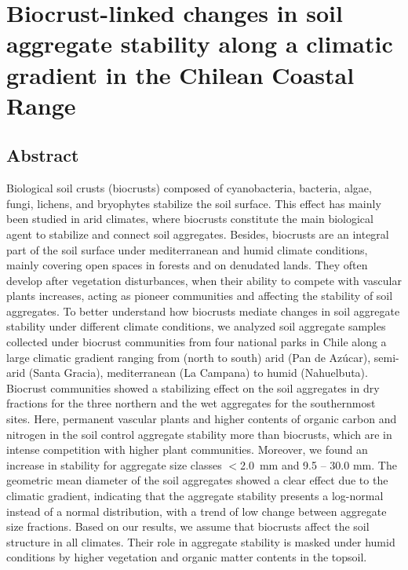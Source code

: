 
\chapter{Biocrust-linked changes in soil aggregate stability along a climatic gradient in the Chilean Coastal Range}
\label{chap:manuscript1} %

\section*{Abstract} %
Biological soil crusts (biocrusts) composed of cyanobacteria, bacteria, algae, fungi, lichens, and bryophytes stabilize the soil surface. This effect has mainly been studied in arid climates, where biocrusts constitute the main biological agent to stabilize and connect soil aggregates. Besides, biocrusts are an integral part of the soil surface under mediterranean and humid climate conditions, mainly covering open spaces in forests and on denudated lands. They often develop after vegetation disturbances, when their ability to compete with vascular plants increases, acting as pioneer communities and affecting the stability of soil aggregates. To better understand how biocrusts mediate changes in soil aggregate stability under different climate conditions, we analyzed soil aggregate samples collected under biocrust communities from four national parks in Chile along a large climatic gradient ranging from (north to south) arid (Pan de Azúcar), semi-arid (Santa Gracia), mediterranean (La Campana) to humid (Nahuelbuta). Biocrust communities showed a stabilizing effect on the soil aggregates in dry fractions for the three northern and the wet aggregates for the southernmost sites. Here, permanent vascular plants and higher contents of organic carbon and nitrogen in the soil control aggregate stability more than biocrusts, which are in intense competition with higher plant communities. Moreover, we found an increase in stability for aggregate size classes $<$\SI{2.0}{\milli\meter} and 9.5 – 30.0 mm. The geometric mean diameter of the soil aggregates showed a clear effect due to the climatic gradient, indicating that the aggregate stability presents a log-normal instead of a normal distribution, with a trend of low change between aggregate size fractions. Based on our results, we assume that biocrusts affect the soil structure in all climates. Their role in aggregate stability is masked under humid conditions by higher vegetation and organic matter contents in the topsoil.

